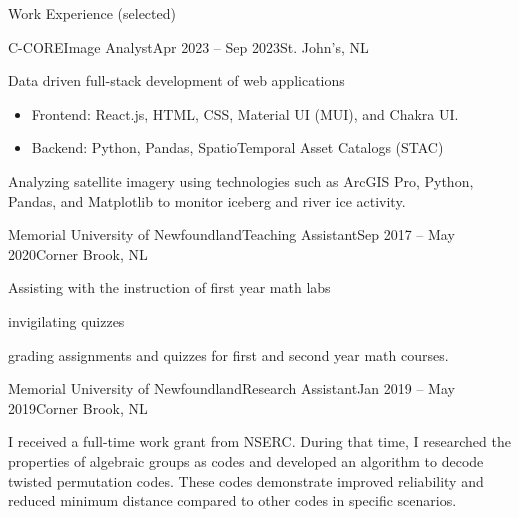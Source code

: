 \documentclass[]{Keenan-Nicholson-Resume}
\begin{document}
\begin{section}{Work Experience (selected)}
    \begin{subsection}{C-CORE}{Image Analyst}{Apr 2023 -- Sep 2023}{St. John's, NL}
        \item Data driven full-stack development of web applications
        \vspace{-4pt}
            \begin{itemize}[itemsep=-6.5pt]
                \item Frontend: React.js, HTML, CSS, Material UI (MUI), and Chakra UI.
                \item Backend: Python, Pandas, SpatioTemporal Asset Catalogs (STAC)
            \end{itemize}
        \vspace{1pt}
        \item Analyzing satellite imagery using technologies such as ArcGIS Pro, Python, Pandas, and Matplotlib to \newline monitor iceberg and river ice activity.
    \end{subsection}

    \begin{subsection}{Memorial University of Newfoundland}{Teaching Assistant}{Sep 2017 -- May 2020}{Corner Brook, NL}
        \item Assisting with the instruction of first year math labs
        \item invigilating quizzes
        \item grading assignments and quizzes for first and second year math courses.
    \end{subsection}
    
    \begin{subsection}{Memorial University of Newfoundland}{Research Assistant}{Jan 2019 -- May 2019}{Corner Brook, NL}
        \item I received a full-time work grant from NSERC. During that time, I researched the properties of algebraic groups as codes and developed an algorithm to decode twisted permutation codes. These codes demonstrate improved reliability and reduced minimum distance compared to other codes in specific scenarios.
    \end{subsection}
\end{section}
\end{document}
